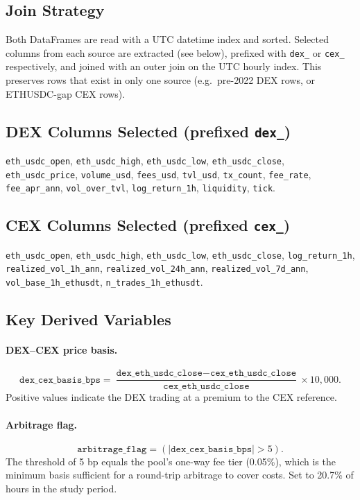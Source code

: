 \documentclass[11pt,a4paper]{article}
\begin{document}
\subsection{Join Strategy}

Both DataFrames are read with a UTC datetime index and sorted. Selected
columns from each source are extracted (see below), prefixed with
\texttt{dex\_} or \texttt{cex\_} respectively, and joined with an outer
join on the UTC hourly index. This preserves rows that exist in only one
source (e.g.\ pre-2022 DEX rows, or ETHUSDC-gap CEX rows).

\subsection{DEX Columns Selected (prefixed \texttt{dex\_})}

\texttt{eth\_usdc\_open}, \texttt{eth\_usdc\_high}, \texttt{eth\_usdc\_low},
\texttt{eth\_usdc\_close}, \texttt{eth\_usdc\_price},
\texttt{volume\_usd}, \texttt{fees\_usd}, \texttt{tvl\_usd},
\texttt{tx\_count}, \texttt{fee\_rate}, \texttt{fee\_apr\_ann},
\texttt{vol\_over\_tvl}, \texttt{log\_return\_1h},
\texttt{liquidity}, \texttt{tick}.

\subsection{CEX Columns Selected (prefixed \texttt{cex\_})}

\texttt{eth\_usdc\_open}, \texttt{eth\_usdc\_high}, \texttt{eth\_usdc\_low},
\texttt{eth\_usdc\_close}, \texttt{log\_return\_1h},
\texttt{realized\_vol\_1h\_ann}, \texttt{realized\_vol\_24h\_ann},
\texttt{realized\_vol\_7d\_ann},
\texttt{vol\_base\_1h\_ethusdt}, \texttt{n\_trades\_1h\_ethusdt}.

\subsection{Key Derived Variables}

\paragraph{DEX--CEX price basis.}
\[
  \texttt{dex\_cex\_basis\_bps} = \frac{\texttt{dex\_eth\_usdc\_close} -
  \texttt{cex\_eth\_usdc\_close}}{\texttt{cex\_eth\_usdc\_close}}
  \times 10{,}000.
\]
Positive values indicate the DEX trading at a premium to the CEX
reference.

\paragraph{Arbitrage flag.}
\[
  \texttt{arbitrage\_flag} = (|\texttt{dex\_cex\_basis\_bps}| > 5).
\]
The threshold of 5 bp equals the pool's one-way fee tier (0.05\%),
which is the minimum basis sufficient for a round-trip arbitrage to
cover costs. Set to 20.7\% of hours in the study period.
\end{document}
